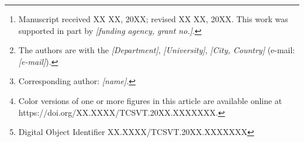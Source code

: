 
\author{%
  Anonymous~Author,%
  ~
  Anonymous~Author,%
  ~
  and~Anonymous~Author,%
  ~%
  \thanks{Manuscript received XX XX, 20XX; revised XX XX, 20XX. %
          This work was supported in part by \textit{[funding agency, grant no.]}.} %
  \thanks{The authors are with the \textit{[Department]}, \textit{[University]},
          \textit{[City, Country]} (e-mail: \textit{[e-mail]}).} %
  \thanks{Corresponding author: \textit{[name]}.} %
  \thanks{Color versions of one or more figures in this article are available
          online at https://doi.org/XX.XXXX/TCSVT.20XX.XXXXXXX.} %
  \thanks{Digital Object Identifier XX.XXXX/TCSVT.20XX.XXXXXXX}%
}
